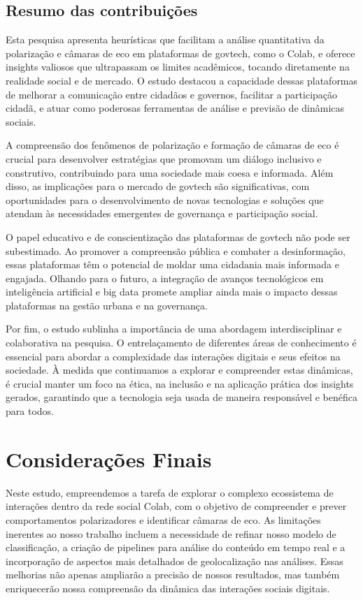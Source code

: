 \subsection*{Resumo das contribuições}

Esta pesquisa apresenta heurísticas que facilitam a análise quantitativa da polarização e câmaras de eco em plataformas de govtech, como o Colab, e oferece insights valiosos que ultrapassam os limites acadêmicos, tocando diretamente na realidade social e de mercado. O estudo destacou a capacidade dessas plataformas de melhorar a comunicação entre cidadãos e governos, facilitar a participação cidadã, e atuar como poderosas ferramentas de análise e previsão de dinâmicas sociais.

A compreensão dos fenômenos de polarização e formação de câmaras de eco é crucial para desenvolver estratégias que promovam um diálogo inclusivo e construtivo, contribuindo para uma sociedade mais coesa e informada. Além disso, as implicações para o mercado de govtech são significativas, com oportunidades para o desenvolvimento de novas tecnologias e soluções que atendam às necessidades emergentes de governança e participação social.

O papel educativo e de conscientização das plataformas de govtech não pode ser subestimado. Ao promover a compreensão pública e combater a desinformação, essas plataformas têm o potencial de moldar uma cidadania mais informada e engajada. Olhando para o futuro, a integração de avanços tecnológicos em inteligência artificial e big data promete ampliar ainda mais o impacto dessas plataformas na gestão urbana e na governança.

Por fim, o estudo sublinha a importância de uma abordagem interdisciplinar e colaborativa na pesquisa. O entrelaçamento de diferentes áreas de conhecimento é essencial para abordar a complexidade das interações digitais e seus efeitos na sociedade. À medida que continuamos a explorar e compreender estas dinâmicas, é crucial manter um foco na ética, na inclusão e na aplicação prática dos insights gerados, garantindo que a tecnologia seja usada de maneira responsável e benéfica para todos.

\section{Considerações Finais}

Neste estudo, empreendemos a tarefa de explorar o complexo ecossistema de interações dentro da rede social Colab, com o objetivo de compreender e prever comportamentos polarizadores e identificar câmaras de eco. As limitações inerentes ao nosso trabalho incluem a necessidade de refinar nosso modelo de classificação, a criação de pipelines para análise do conteúdo em tempo real e a incorporação de aspectos mais detalhados de geolocalização nas análises. Essas melhorias não apenas ampliarão a precisão de nossos resultados, mas também enriquecerão nossa compreensão da dinâmica das interações sociais digitais.

